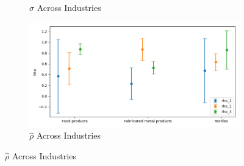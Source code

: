 \documentclass{article}
\begin{document}
\begin{figure}[ht!]
\begin{subfigure}[t]{0.32\textwidth}
        \caption{$\hat\sigma$ Across Industries}
    \end{subfigure}
    \begin{subfigure}[t]{0.32\textwidth}
        \centering
        \includegraphics[width=\textwidth]{figure/ar1_normal_rho_across_industries_m3.png}
        \caption{$\hat\rho$ Across Industries}
    \end{subfigure}
\end{figure}
\end{document}
